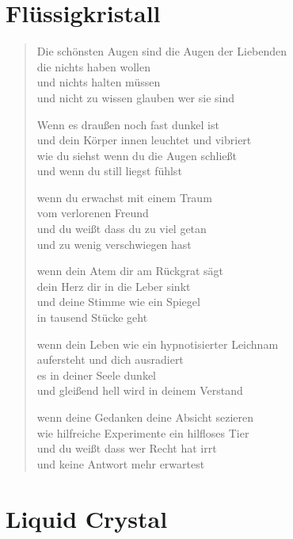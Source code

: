 
\cleartoverso

\section{Flüssigkristall}

\begin{verse}

Die schönsten Augen sind die Augen der Liebenden\\
die nichts haben wollen\\
und nichts halten müssen\\
und nicht zu wissen glauben wer sie sind

Wenn es draußen noch fast dunkel ist\\
und dein Körper innen leuchtet und vibriert\\
wie du siehst wenn du die Augen schließt\\
und wenn du still liegst fühlst

wenn du erwachst mit einem Traum\\
vom verlorenen Freund\\
und du weißt dass du zu viel getan\\
und zu wenig verschwiegen hast

wenn dein Atem dir am Rückgrat sägt\\
dein Herz dir in die Leber sinkt\\
und deine Stimme wie ein Spiegel\\
in tausend Stücke geht

wenn dein Leben wie ein hypnotisierter Leichnam\\
aufersteht und dich ausradiert\\
es in deiner Seele dunkel\\
und gleißend hell wird in deinem Verstand

wenn deine Gedanken deine Absicht sezieren\\
wie hilfreiche Experimente ein hilfloses Tier\\
und du weißt dass wer Recht hat irrt\\
und keine Antwort mehr erwartest

\end{verse}

\clearpage

\section{Liquid Crystal}

